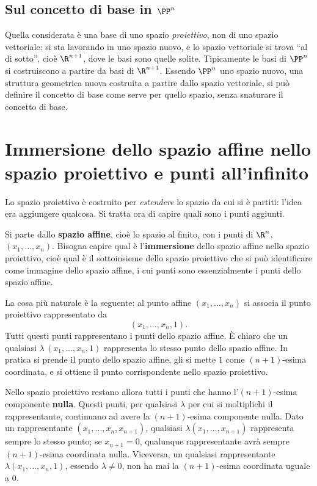 \subsection{Sul concetto di base in $\PP^n$}

Quella considerata è una base di uno spazio \emph{proiettivo}, non di uno spazio vettoriale: si sta lavorando in uno spazio nuovo, e lo spazio vettoriale si trova ``al di sotto'', cioè $\R^{n+1}$, dove le basi sono quelle solite. Tipicamente le basi di $\PP^n$ si costruiscono a partire da basi di $\R^{n+1}$. Essendo $\PP^n$ uno spazio nuovo, una struttura geometrica nuova costruita a partire dallo spazio vettoriale, si può definire il concetto di base come serve per quello spazio, senza snaturare il concetto di base.

\section{Immersione dello spazio affine nello spazio proiettivo e punti all'infinito}

Lo spazio proiettivo è costruito per \emph{estendere} lo spazio da cui si è partiti: l'idea era aggiungere qualcosa. Si tratta ora di capire quali sono i punti aggiunti.

Si parte dallo \textbf{spazio affine}, cioè lo spazio al finito, con i punti di $\R^n$, $(x_1,\dots,x_n)$. Bisogna capire qual è l'\textbf{immersione} dello spazio affine nello spazio proiettivo, cioè qual è il sottoinsieme dello spazio proiettivo che si può identificare come immagine dello spazio affine, i cui punti sono essenzialmente i punti dello spazio affine.

La cosa più naturale è la seguente: al punto affine $(x_1,\dots,x_n)$ si associa il punto proiettivo rappresentato da
\[
  (x_1,\dots,x_n,1).
\]
Tutti questi punti rappresentano i punti dello spazio affine. È chiaro che un qualsiasi $\lambda\,(x_1,\dots,x_n,1)$ rappresenta lo stesso punto dello spazio affine. In pratica si prende il punto dello spazio affine, gli si mette $1$ come $(n+1)$-esima coordinata, e si ottiene il punto corrispondente nello spazio proiettivo.

Nello spazio proiettivo restano allora tutti i punti che hanno l'$(n+1)$-esima componente \textbf{nulla}. Questi punti, per qualsiasi $\lambda$ per cui si moltiplichi il rappresentante, continuano ad avere la $(n+1)$-esima componente nulla. Dato un rappresentante $(x_1,\dots,x_n,x_{n+1})$, qualsiasi $\lambda(x_1,\dots,x_{n+1})$ rappresenta sempre lo stesso punto; se $x_{n+1}=0$, qualunque rappresentante avrà sempre $(n+1)$-esima coordinata nulla. Viceversa, un qualsiasi rappresentante $\lambda(x_1,\dots,x_n,1)$, essendo $\lambda\neq 0$, non ha mai la $(n+1)$-esima coordinata uguale a $0$.

